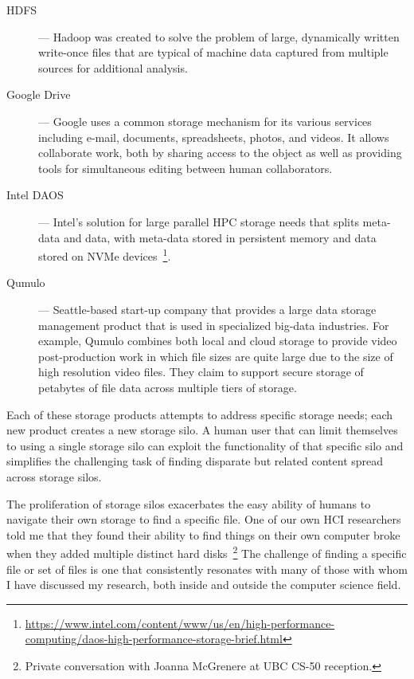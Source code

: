 \begin{description}
    \item[\ac{HDFS}] --- Hadoop was created to solve the problem of large,
        dynamically written write-once files that are typical of machine data
        captured from multiple sources for additional analysis.

    \item[Google Drive] --- Google uses a common storage mechanism for its various
        services including e-mail, documents, spreadsheets, photos, and videos. It
        allows collaborate work, both by sharing access to the object as well as
        providing tools for simultaneous editing between human collaborators.

    \item[Intel DAOS]
        --- Intel's solution for large parallel \ac{HPC} storage
        needs that splits meta-data and data, with meta-data stored in persistent
        memory and data stored on \ac{NVMe} devices~\footnote{\url{https://www.intel.com/content/www/us/en/high-performance-computing/daos-high-performance-storage-brief.html}}.

    \item[Qumulo] --- Seattle-based start-up company that provides a large data
        storage management product that is used in specialized big-data industries.
        For example, Qumulo combines both local and cloud storage to provide video
        post-production work in which file sizes are quite large due to the size of
        high resolution video files. They claim to support secure storage of
        petabytes of file data across multiple tiers of storage.
\end{description}


Each of these storage products attempts to address specific storage needs; each
new product creates a new storage silo.  A human user that can limit themselves
to using a single storage silo can exploit the functionality of that specific
silo and simplifies the challenging task of finding disparate but related
content spread across storage silos.

The proliferation of storage silos exacerbates the easy ability of humans to
navigate their own storage to find a specific file.  One of our own \ac{HCI}
researchers told me that they found their ability to find things on their own
computer broke when they added multiple distinct hard disks~\footnote{Private
    conversation with Joanna McGrenere at UBC CS-50 reception.} The challenge of
finding a specific file or set of files is one that consistently resonates with
many of those with whom I have discussed my research, both inside and outside
the computer science field.

